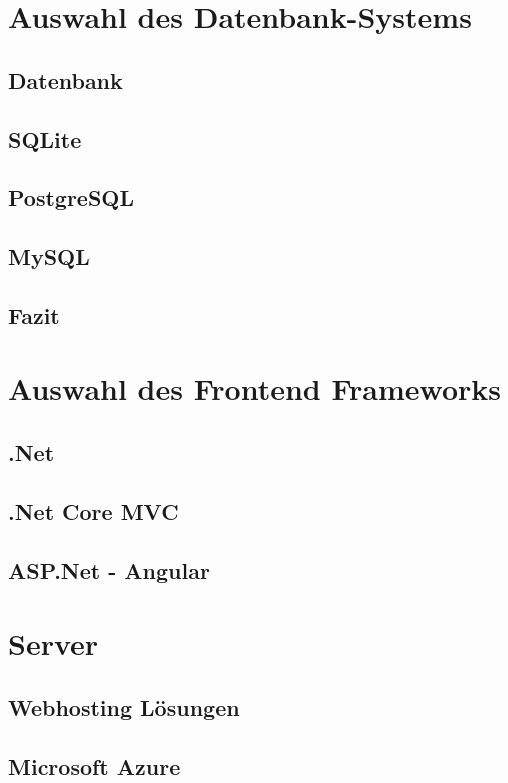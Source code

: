 \section{Auswahl des Datenbank-Systems}
    
    \subsection{Datenbank}
        
    \subsection{SQLite}
        
        \newpage
    \subsection{PostgreSQL}
        
    \subsection{MySQL}
        
        \newpage
    \subsection{Fazit}
    \lipsum[5-12]
\section{Auswahl des Frontend Frameworks}
    \lipsum[5-12]
    \subsection{.Net}
        \lipsum[5-12]
    \subsection{.Net Core MVC}
        \lipsum[5-12]
    \subsection{ASP.Net - Angular}
        \lipsum[5-12]
\section{Server}
    \lipsum[5-12]
    \subsection{Webhosting Lösungen}
        \lipsum[5-12]
    \subsection{Microsoft Azure}
        \lipsum[5-12]
